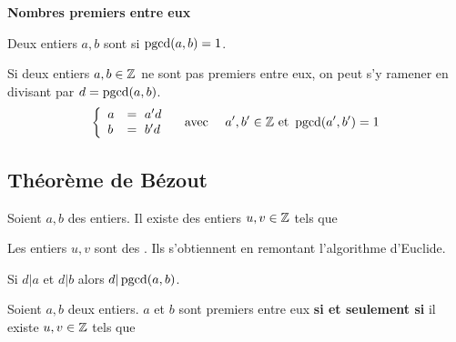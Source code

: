\documentclass[10pt,class=article,crop=false]{standalone}
\begin{document}
\begin{multicols}{2}
\textbf{Nombres premiers entre eux}

	Deux entiers $a,b$ sont
	si $\mathop{\text{pgcd}}(a,b)=1$.



Si deux entiers $a,b \in \mathbb{Z}$ ne sont pas premiers entre eux, on peut s'y ramener en divisant par $d = \mathop{\text{pgcd}}(a,b)$.
$$\left\{\begin{array}{ll} a &= \ a'd \\ b &=\  b'd \\ \end{array} \quad \text{ avec }\quad  a',b' \in \mathbb{Z} \text{ et } \mathop{\text{pgcd}}(a',b')=1 \right.$$


\subsection{Théorème de Bézout}


\begin{theoreme}
	Soient $a,b$ des entiers. Il existe
	des entiers $u,v \in \mathbb{Z}$ tels que
\end{theoreme}

Les entiers $u,v$ sont des .
Ils s'obtiennent en \og remontant \fg{} l'algorithme d'Euclide.



\begin{corollaire}
	Si $d|a$ et $d|b$ alors $d | \mathop{\text{pgcd}}(a,b)$.
\end{corollaire}



\begin{corollaire}
	Soient $a, b$ deux entiers. $a$ et $b$ sont premiers entre eux
	\textbf{si et seulement si} il existe $u,v \in \mathbb{Z}$ tels que
\end{corollaire}


\end{multicols}
\end{document}
